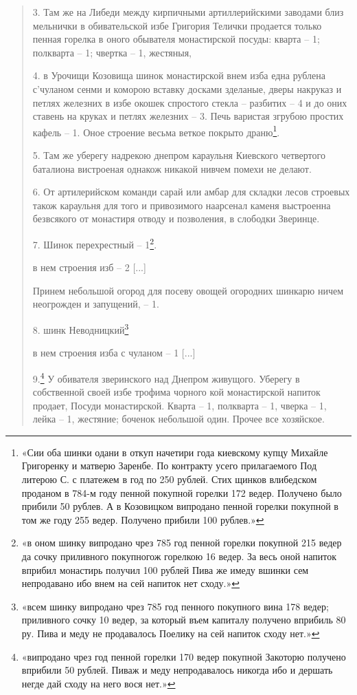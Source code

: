 \begin{quotation}
3. Там же на Либеди между кирпичными артиллерийскими заводами близ мельнички в обивательской избе Григория Телички продается только пенная горелка в оного обывателя монастирской посуды: кварта – 1; полкварта – 1; чвертка – 1, жестяныя,

4. в Урочищи Козовища шинок монастирской внем изба една рублена с'чуланом сенми и коморою вставку досками зделаные, дверы накруказ и петлях железних в избе окошек спростого стекла – разбитих – 4 и до оних ставень на круках и петлях железних – 3. Печь варистая згрубою простих кафель – 1. Оное строение весьма веткое покрыто драню\footnote{«Сии оба шинки одани в откуп начетири года киевскому купцу Михайле Григоренку и матверю Заренбе. По контракту усего прилагаемого Под литерою С. с платежем в год по 250 рублей. Стих щинков влибедском проданом в 784-м году пенной покупной горелки 172 ведер. Получено было прибили 50 рублев. А в Козовицком випродано пенной горелки покупной в том же году 255 ведер. Получено прибили 100 рублев.»}.

5. Там же уберегу надрекою днепром караульня Киевского четвертого баталиона вистроеная однакож никакой нивчем помехи не делают.

6. От артилерийском команди сарай или амбар для складки лесов строевых також караульня для того и привозимого наарсенал каменя выстроенна безвсякого от монастиря отводу и позволения, в слободки Зверинце.

7. Шинок перехрестный – 1\footnote{«в оном шинку випродано чрез 785 год пенной горелки покупной 215 ведер да сочку приливного покупногож горелкою 16 ведер. За весь оной напиток вприбил монастирь получил 100 рублей Пива же имеду вшинки сем непродавано ибо внем на сей напиток нет сходу.»}.

в нем строения изб – 2 [...]

Принем небольшой огород для посеву овощей огородних шинкарю ничем неогрожден и запущений, – 1.

8. шинк Неводницкий\footnote{«всем шинку випродано чрез 785 год пенного покупного вина 178 ведер; приливного сочку 10 ведер, за который въем капиталу получено вприбиль 80 ру. Пива и меду не продавалось Поелику на сей напиток сходу нет.»}

в нем строения изба с чуланом – 1 [...]

9.\footnote{«випродано чрез год пенной горелки 170 ведер покупной Закоторю получено вприбили 50 рублей. Пиваж и меду непродавалось никогда ибо и дершать негде дай сходу на него вося нет.»} У обивателя зверинского над Днепром живущого. Уберегу в собственной своей избе трофима чорного кой монастирской напиток продает, Посуди монастирской. Кварта – 1, полкварта – 1, чверка – 1, лейка – 1, жестяние; боченок небольшой один. Прочее все хозяйское.


\end{quotation}
